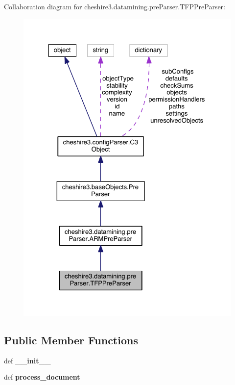 Collaboration diagram for cheshire3.\-datamining.\-pre\-Parser.\-T\-F\-P\-Pre\-Parser\-:
\nopagebreak
\begin{figure}[H]
\begin{center}
\leavevmode
\includegraphics[width=325pt]{classcheshire3_1_1datamining_1_1pre_parser_1_1_t_f_p_pre_parser__coll__graph}
\end{center}
\end{figure}
\subsection*{Public Member Functions}
\begin{DoxyCompactItemize}
\item 
\hypertarget{classcheshire3_1_1datamining_1_1pre_parser_1_1_t_f_p_pre_parser_af051c54203e42a44b90ac95ae28250f0}{def {\bfseries \-\_\-\-\_\-init\-\_\-\-\_\-}}\label{classcheshire3_1_1datamining_1_1pre_parser_1_1_t_f_p_pre_parser_af051c54203e42a44b90ac95ae28250f0}

\item 
\hypertarget{classcheshire3_1_1datamining_1_1pre_parser_1_1_t_f_p_pre_parser_aeedc142f6c11fd7cdefb7b72bde8326c}{def {\bfseries process\-\_\-document}}\label{classcheshire3_1_1datamining_1_1pre_parser_1_1_t_f_p_pre_parser_aeedc142f6c11fd7cdefb7b72bde8326c}

\end{DoxyCompactItemize}
